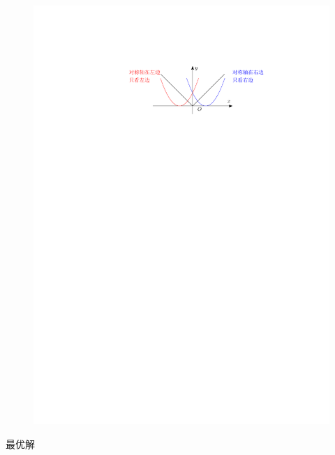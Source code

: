 \begin{enumerate}
\begin{itemize}
\begin{figure}[htbp]
            \includegraphics{image/可分离变量.pdf}
        \end{figure}
        最优解
        

\end{itemize}
\end{enumerate}
